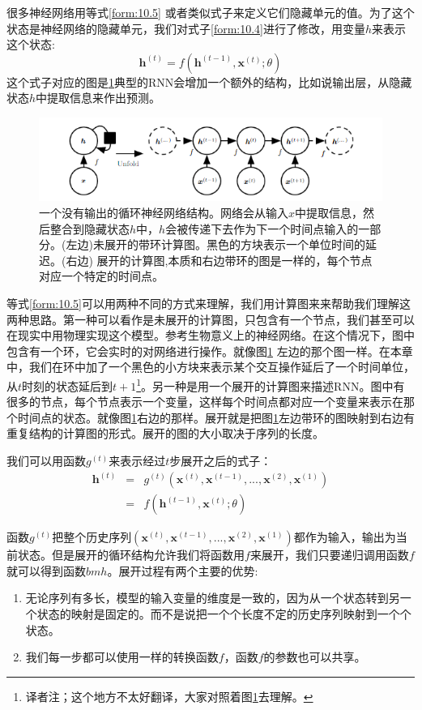 很多神经网络用等式\ref{form:10.5} 或者类似式子来定义它们隐藏单元的值。为了这个状态是神经网络的隐藏单元，我们对式子\ref{form:10.4}进行了修改，用变量$h$来表示这个状态:
\begin{equation}
\bm{h}^{(t)} = f(\bm{h}^{(t-1)},\bm{x}^{(t)};\theta)
\label{form:10.5}
\end{equation}
这个式子对应的图是\ref{fig:10_2}典型的RNN会增加一个额外的结构，比如说输出层，从隐藏状态$h$中提取信息来作出预测。
\begin{figure}[htbp] %
   \centering
   \includegraphics[width=6in]{fig/chap10/10_2.PNG} 
   \caption{一个没有输出的循环神经网络结构。网络会从输入$x$中提取信息，然后整合到隐藏状态$h$中，$h$会被传递下去作为下一个时间点输入的一部分。(左边)未展开的带环计算图。黑色的方块表示一个单位时间的延迟。(右边) 展开的计算图,本质和右边带环的图是一样的，每个节点对应一个特定的时间点。}
   \label{fig:10_2}
\end{figure}

等式\ref{form:10.5}可以用两种不同的方式来理解，我们用计算图来来帮助我们理解这两种思路。第一种可以看作是未展开的计算图，只包含有一个节点，我们甚至可以在现实中用物理实现这个模型。参考生物意义上的神经网络。在这个情况下，图中包含有一个环，它会实时的对网络进行操作。就像图\ref{fig:10_2} 左边的那个图一样。在本章中，我们在环中加了一个黑色的小方块来表示某个交互操作延后了一个时间单位，从$t$时刻的状态延后到$t+1$\footnote{译者注；这个地方不太好翻译，大家对照着图\ref{fig:10_2}去理解。}。另一种是用一个展开的计算图来描述RNN。图中有很多的节点，每个节点表示一个变量，这样每个时间点都对应一个变量来表示在那个时间点的状态。就像图\ref{fig:10_2}右边的那样。展开就是把图\ref{fig:10_2}左边带环的图映射到右边有重复结构的计算图的形式。展开的图的大小取决于序列的长度。

我们可以用函数$g^{(t)}$来表示经过$t$步展开之后的式子：
\begin{eqnarray}
\bm{h}^{(t)} & = & g^{(t)}(\bm{x}^{(t)},\bm{x}^{(t-1)},...,\bm{x}^{(2)},\bm{x}^{(1)}) \\
& = & f(\bm{h}^{(t-1)},\bm{x}^{(t)};\theta)
\end{eqnarray}

函数$g^{(t)}$把整个历史序列$(\bm{x}^{(t)},\bm{x}^{(t-1)},...,\bm{x}^{(2)},\bm{x}^{(1)})$都作为输入，输出为当前状态。但是展开的循环结构允许我们将函数用$f$来展开，我们只要递归调用函数$f$就可以得到函数$bm{h}$。展开过程有两个主要的优势:
\begin{enumerate}
\item 无论序列有多长，模型的输入变量的维度是一致的，因为从一个状态转到另一个状态的映射是固定的。而不是说把一个个长度不定的历史序列映射到一个个状态。
\item 我们每一步都可以使用一样的转换函数$f$，函数$f$的参数也可以共享。
\end{enumerate}

